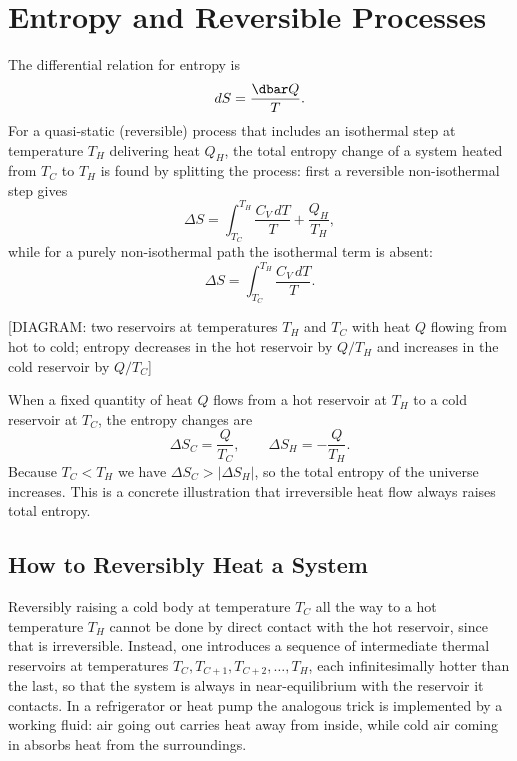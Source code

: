 \section{Entropy and Reversible Processes}

The differential relation for entropy is
\begin{equation}
    dS = \frac{\dbar Q}{T}.
\end{equation}
For a quasi-static (reversible) process that includes an isothermal step at temperature $T_H$ delivering heat $Q_H$, the total entropy change of a system heated from $T_C$ to $T_H$ is found by splitting the process: first a reversible non-isothermal step gives
\begin{equation}
    \Delta S = \int_{T_C}^{T_H} \frac{C_V \, dT}{T} + \frac{Q_H}{T_H},
\end{equation}
while for a purely non-isothermal path the isothermal term is absent:
\begin{equation}
    \Delta S = \int_{T_C}^{T_H} \frac{C_V \, dT}{T}.
\end{equation}

\begin{center}[DIAGRAM: two reservoirs at temperatures $T_H$ and $T_C$ with heat $Q$ flowing from hot to cold; entropy decreases in the hot reservoir by $Q/T_H$ and increases in the cold reservoir by $Q/T_C$]\end{center}

When a fixed quantity of heat $Q$ flows from a hot reservoir at $T_H$ to a cold reservoir at $T_C$, the entropy changes are
\begin{equation}
    \Delta S_C = \frac{Q}{T_C}, \qquad \Delta S_H = -\frac{Q}{T_H}.
\end{equation}
Because $T_C < T_H$ we have $\Delta S_C > |\Delta S_H|$, so the total entropy of the universe increases. This is a concrete illustration that irreversible heat flow always raises total entropy.

\subsection{How to Reversibly Heat a System}

Reversibly raising a cold body at temperature $T_C$ all the way to a hot temperature $T_H$ cannot be done by direct contact with the hot reservoir, since that is irreversible. Instead, one introduces a sequence of intermediate thermal reservoirs at temperatures $T_C, T_{C+1}, T_{C+2}, \ldots, T_H$, each infinitesimally hotter than the last, so that the system is always in near-equilibrium with the reservoir it contacts. In a refrigerator or heat pump the analogous trick is implemented by a working fluid: air going out carries heat away from inside, while cold air coming in absorbs heat from the surroundings.

